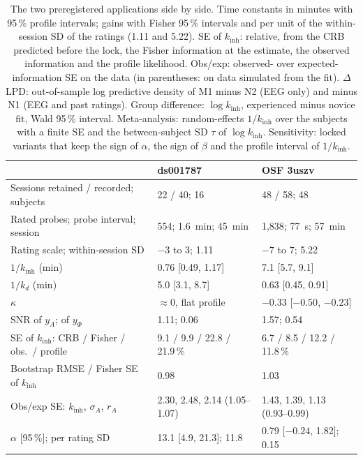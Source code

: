 \documentclass[12pt,a4paper]{article}
\theoremstyle{plain}
\theoremstyle{definition}
\theoremstyle{remark}
\newcommand{\kinh}{k_{\mathrm{inh}}}
\newcommand{\kd}{k_{d}}
\newcommand{\sA}{\sigma_{A}}
\newcommand{\rA}{r_{A}}
\begin{document}
\begin{table}[htbp]
\centering
\caption{The two preregistered applications side by side. Time constants in minutes with 95\,\% profile intervals; gains with Fisher 95\,\% intervals and per unit of the within-session SD of the ratings (1.11 and 5.22). SE of $\kinh$: relative, from the CRB predicted before the lock, the Fisher information at the estimate, the observed information and the profile likelihood. Obs/exp: observed- over expected-information SE on the data (in parentheses: on data simulated from the fit). $\Delta$LPD: out-of-sample log predictive density of M1 minus N2 (EEG only) and minus N1 (EEG and past ratings). Group difference: $\log\kinh$, experienced minus novice fit, Wald 95\,\% interval. Meta-analysis: random-effects $1/\kinh$ over the subjects with a finite SE and the between-subject SD $\tau$ of $\log\kinh$. Sensitivity: locked variants that keep the sign of $\alpha$, the sign of $\beta$ and the profile interval of $1/\kinh$.}
\label{tab:real-compare}
\footnotesize\setlength{\tabcolsep}{3pt}
\begin{tabular}{lll}
\toprule
 & ds001787 & OSF 3uszv \\
\midrule
Sessions retained / recorded; subjects   & 22 / 40; 16 & 48 / 58; 48 \\
Rated probes; probe interval; session   & 554; 1.6~min; 45~min & 1{,}838; 77~s; 57~min \\
Rating scale; within-session SD         & $-3$ to $3$; 1.11 & $-7$ to $7$; 5.22 \\
$1/\kinh$ (min)                          & 0.76 [0.49, 1.17] & 7.1 [5.7, 9.1] \\
$1/\kd$ (min)                            & 5.0 [3.1, 8.7] & 0.63 [0.45, 0.91] \\
$\kappa$                                 & $\approx0$, flat profile & $-0.33$ [$-0.50$, $-0.23$] \\
SNR of $y_A$; of $y_\Phi$                & 1.11; 0.06 & 1.57; 0.54 \\
SE of $\kinh$: CRB / Fisher / obs.\ / profile & 9.1 / 9.9 / 22.8 / 21.9\,\% & 6.7 / 8.5 / 12.2 / 11.8\,\% \\
Bootstrap RMSE / Fisher SE of $\kinh$    & 0.98 & 1.03 \\
Obs/exp SE: $\kinh$, $\sA$, $\rA$        & 2.30, 2.48, 2.14 (1.05--1.07) & 1.43, 1.39, 1.13 (0.93--0.99) \\
$\alpha$ [95\,\%]; per rating SD        & 13.1 [4.9, 21.3]; 11.8 & 0.79 [$-0.24$, 1.82]; 0.15 \\

\end{tabular}
\end{table}
\end{document}
